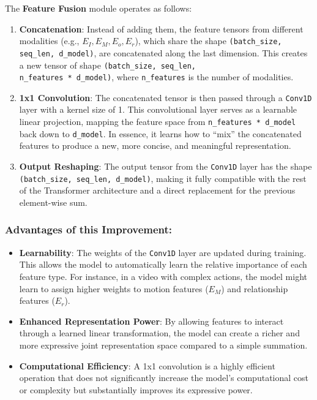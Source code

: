 The \textbf{Feature Fusion} module operates as follows:
\begin{enumerate}
    \item \textbf{Concatenation}: Instead of adding them, the feature tensors from different modalities (e.g., $E_I, E_M, E_o, E_r$), which share the shape \texttt{(batch\_size, seq\_len, d\_model)}, are concatenated along the last dimension. This creates a new tensor of shape \texttt{(batch\_size, seq\_len,\\ n\_features * d\_model)}, where \texttt{n\_features} is the number of modalities.
    
    \item \textbf{1x1 Convolution}: The concatenated tensor is then passed through a \texttt{Conv1D} layer with a kernel size of 1. This convolutional layer serves as a learnable linear projection, mapping the feature space from \texttt{n\_features * d\_model} back down to \texttt{d\_model}. In essence, it learns how to ``mix'' the concatenated features to produce a new, more concise, and meaningful representation.
    
    \item \textbf{Output Reshaping}: The output tensor from the \texttt{Conv1D} layer has the shape \texttt{(batch\_size, seq\_len, d\_model)}, making it fully compatible with the rest of the Transformer architecture and a direct replacement for the previous element-wise sum.
\end{enumerate}

\subsubsection*{Advantages of this Improvement:}
\begin{itemize}
    \item \textbf{Learnability}: The weights of the \texttt{Conv1D} layer are updated during training. This allows the model to automatically learn the relative importance of each feature type. For instance, in a video with complex actions, the model might learn to assign higher weights to motion features ($E_M$) and relationship features ($E_r$).
    
    \item \textbf{Enhanced Representation Power}: By allowing features to interact through a learned linear transformation, the model can create a richer and more expressive joint representation space compared to a simple summation.
    
    \item \textbf{Computational Efficiency}: A 1x1 convolution is a highly efficient operation that does not significantly increase the model's computational cost or complexity but substantially improves its expressive power.
\end{itemize}

